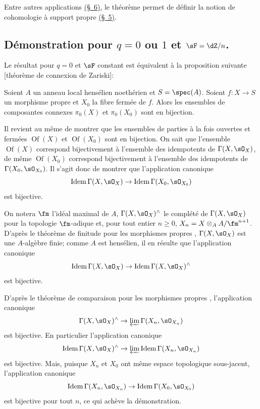Entre autres applications \hyperref[I:4-6]{(\S~6)}, le théorème permet de définir la notion 
de cohomologie à support propre \hyperref[I:4-5]{(\S~5)}. 










\subsection{Démonstration pour \texorpdfstring{$q=0$}{q=0} ou \texorpdfstring{$1$}{1} et \texorpdfstring{$\sF=\dZ/n$}{F=Z/n}.}\label{I:4-2} 

Le résultat pour $q=0$ et $\sF$ constant est équivalent à la proposition 
suivante [théorème de connexion de Zariski]:





\begin{propositiondotdash}\label{I:4-2-1}
Soient $A$ un anneau local hensélien noethérien et $S=\spec(A)$. 
Soient $f:X\to S$ un morphisme propre et $X_0$ la fibre fermée de $f$. Alors 
les ensembles de composantes connexes $\pi_0(X)$ et $\pi_0(X_0)$ sont en 
bijection.
\end{propositiondotdash}

Il revient au même de montrer que les ensembles de parties à la fois 
ouvertes et fermées $\operatorname{Of}(X)$ et $\operatorname{Of}(X_0)$ sont 
en bijection. On sait que l'ensemble $\operatorname{Of}(X)$ correspond 
bijectivement à l'ensemble des idempotents de $\Gamma(X,\sO_X)$, de même 
$\operatorname{Of}(X_0)$ correspond bijectivement à l'ensemble des 
idempotents de $\Gamma(X_0,\sO_{X_0})$. Il s'agit donc de montrer que 
l'application canonique 
\[
  \operatorname{Idem} \Gamma(X,\sO_X) \to \operatorname{Idem}\Gamma(X_0,\sO_{X_0})
\]
est bijective. 

On notera $\fm$ l'idéal maximal de $A$, $\Gamma(X,\sO_X)^\wedge$ le complété 
de $\Gamma(X,\sO_X)$ pour la topologie $\fm$-adique et, pour tout entier 
$n\geqslant 0$, $X_n=X\otimes_A A/\fm^{n+1}$. D'après le théorème de finitude 
pour les morphismes propres , $\Gamma(X,\sO_X)$ est une 
$A$-algèbre finie; comme $A$ est hensélien, il en résulte que 
l'application canonique 
\[
  \operatorname{Idem} \Gamma(X,\sO_X) \to \operatorname{Idem}\Gamma(X,\sO_X)^\wedge
\]
est bijective. 

D'après le théorème de comparaison pour les morphismes propres 
, l'application canonique 
\[
  \Gamma(X,\sO_X)^\wedge \to \varprojlim \Gamma(X_n,\sO_{X_n})
\]
est bijective. En particulier l'application canonique 
\[
  \operatorname{Idem} \Gamma(X,\sO_X)^\wedge \to \varprojlim \operatorname{Idem}\Gamma(X_n,\sO_{X_n})
\]
est bijective. Mais, puisque $X_n$ et $X_0$ ont même espace topologique 
sous-jacent, l'application canonique 
\[
  \operatorname{Idem}\Gamma(X_n,\sO_{X_n}) \to \operatorname{Idem} \Gamma(X_0,\sO_{X_0})
\]
est bijective pour tout $n$, ce qui achève la démonstration. 

